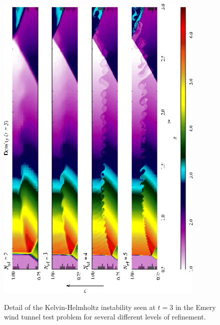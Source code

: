 \begin{figure}
\begin{center}
{\leavevmode\includegraphics[height=6in,angle=-90]{WindTunnel_kh_detail}}
\end{center}
\caption{\label{Fig:Wind tunnel KH} Detail of the Kelvin-Helmholtz
instability seen at $t=3$ in the Emery
wind tunnel test problem for several different levels of refinement.
}
\end{figure}

